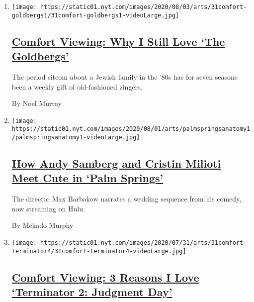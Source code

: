 \begin{enumerate}
\def\labelenumi{\arabic{enumi}.}
\item
  \texttt{[image: https://static01.nyt.com/images/2020/08/03/arts/31comfort-goldbergs1/31comfort-goldbergs1-videoLarge.jpg]}

  \hypertarget{comfort-viewing-why-i-still-love-the-goldbergs}{%
  \subsection{\texorpdfstring{\href{/2020/07/31/arts/television/goldbergs-abc-stream.html}{Comfort
  Viewing: Why I Still Love `The
  Goldbergs'}}{Comfort Viewing: Why I Still Love `The Goldbergs'}}\label{comfort-viewing-why-i-still-love-the-goldbergs}}

  The period sitcom about a Jewish family in the '80s has for seven
  seasons been a weekly gift of old-fashioned zingers.

  By Noel Murray
\item
  \texttt{[image: https://static01.nyt.com/images/2020/08/01/arts/palmspringsanatomy1/palmspringsanatomy1-videoLarge.jpg]}

  \hypertarget{how-andy-samberg-and-cristin-milioti-meet-cute-in-palm-springs}{%
  \subsection{\texorpdfstring{\href{/2020/07/31/movies/palm-springs-clip-hulu.html}{How
  Andy Samberg and Cristin Milioti Meet Cute in `Palm
  Springs'}}{How Andy Samberg and Cristin Milioti Meet Cute in `Palm Springs'}}\label{how-andy-samberg-and-cristin-milioti-meet-cute-in-palm-springs}}

  The director Max Barbakow narrates a wedding sequence from his comedy,
  now streaming on Hulu.

  By Mekado Murphy
\item
  \texttt{[image: https://static01.nyt.com/images/2020/07/31/arts/31comfort-terminator4/31comfort-terminator4-videoLarge.jpg]}

  \hypertarget{comfort-viewing-3-reasons-i-love-terminator-2-judgment-day}{%
  \subsection{\texorpdfstring{\href{/2020/07/31/movies/comfort-viewing-terminator-2.html}{Comfort
  Viewing: 3 Reasons I Love `Terminator 2: Judgment
  Day'}}{Comfort Viewing: 3 Reasons I Love `Terminator 2: Judgment Day'}}\label{comfort-viewing-3-reasons-i-love-terminator-2-judgment-day}}


\end{enumerate}
